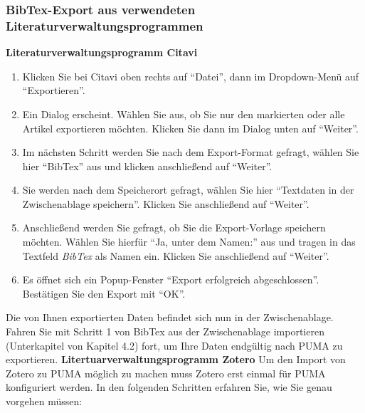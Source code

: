 \documentclass[b5paper,11pt,twoside]{scrbook} %
\begin{document}
\subsubsection{BibTex-Export aus verwendeten Literaturverwaltungsprogrammen}
\textbf{Literaturverwaltungsprogramm Citavi} 
\begin{enumerate}
    \item Klicken Sie bei Citavi oben rechts auf \enquote{Datei}, dann im Dropdown-Menü auf \enquote{Exportieren}.
    \item Ein Dialog erscheint. Wählen Sie aus, ob Sie nur den markierten oder alle Artikel exportieren möchten. Klicken Sie dann im Dialog unten auf \enquote{Weiter}.
    \item Im nächsten Schritt werden Sie nach dem Export-Format gefragt, wählen Sie hier \enquote{BibTex} aus und klicken anschließend auf \enquote{Weiter}.
    \item Sie werden nach dem Speicherort gefragt, wählen Sie hier \enquote{Textdaten in der Zwischenablage speichern}. Klicken Sie anschließend auf \enquote{Weiter}.
    \item Anschließend werden Sie gefragt, ob Sie die Export-Vorlage speichern möchten. Wählen Sie hierfür \enquote{Ja, unter dem Namen:} aus und tragen in das Textfeld \textit{BibTex} als Namen ein. Klicken Sie anschließend auf \enquote{Weiter}.%
    \item Es öffnet sich ein Popup-Fenster \enquote{Export erfolgreich abgeschlossen}. Bestätigen Sie den Export mit \enquote{OK}.
\end{enumerate}
Die von Ihnen exportierten Daten befindet sich nun in der Zwischenablage. Fahren Sie mit Schritt 1 von BibTex aus der Zwischenablage importieren (Unterkapitel von Kapitel 4.2) fort, um Ihre Daten endgültig nach PUMA zu exportieren.\newline
\newline
\textbf{Litertuarverwaltungsprogramm Zotero} 
\newline \newline
Um den Import von Zotero zu PUMA möglich zu machen muss Zotero erst einmal für PUMA konfiguriert werden. In den folgenden Schritten erfahren Sie, wie Sie genau vorgehen müssen:
\end{document}
